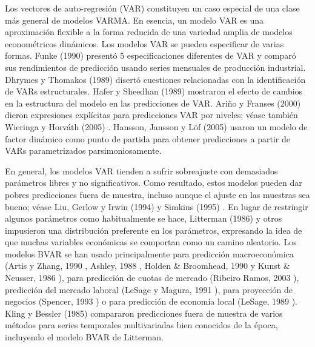 \documentclass{llncs}
\begin{document}
Los vectores de auto-regresión (VAR) constituyen un caso especial de una clase más general de modelos VARMA. En esencia, un modelo VAR es una aproximación flexible a la forma reducida de una variedad amplia de modelos econométricos dinámicos. Los modelos VAR se pueden especificar de varias formas. Funke (1990) \cite{Funke1990363} presentó 5 especificaciones diferentes de VAR y comparó sus rendimientos de predicción usando series mensuales de producción industrial. Dhrymes y Thomakos (1989) \cite{Dhrymes198881} disertó cuestiones relacionadas con la identificación de VARs estructurales. Hafer y Sheedhan (1989) \cite{Hafer1989399} mostraron el efecto de cambios en la estructura del modelo en las predicciones de VAR. Ariño y Franses (2000) \cite{Ariño2000111} dieron expresiones explícitas para predicciones VAR por niveles; véase también Wieringa y Horváth (2005) \cite{Wieringa2005279}. Hansson, Jansson y Löf (2005) \cite{Hansson2005377} usaron un modelo de factor dinámico como punto de partida para obtener predicciones a partir de VARs parametrizados parsimoniosamente.

En general, los modelos VAR tienden a sufrir sobreajuste con demasiados parámetros libres y no significativos. Como resultado, estos modelos pueden dar pobres predicciones fuera de muestra, incluso aunque el ajuste en las muestras sea bueno; véase Liu, Gerlow y Irwin (1994) \cite{Liu1994419} y Simkins (1995) \cite{Simkins1995569}. En lugar de restringir algunos parámetros como habitualmente se hace, Litterman (1986) \cite{Litterman198625} y otros impusieron una distribución preferente en los parámetros, expresando la idea de que muchas variables económicas se comportan como un camino aleatorio. Los modelos BVAR se han usado principalmente para predicción macroeconómica (Artis y Zhang, 1990 \cite{Artis1990349}, Ashley, 1988 \cite{Ashley1988363}, Holden \& Broomhead, 1990 \cite{Holden199011} y Kunst \& Neusser, 1986 \cite{Kunst1986447}), para predicción de cuotas de mercado (Ribeiro Ramos, 2003 \cite{RibeiroRamos200395}), predicción del mercado laboral (LeSage y Magura, 1991 \cite{LeSage1991231}), para proyección de negocios (Spencer, 1993 \cite{Spencer1993407}) o para predicción de economía local (LeSage, 1989  \cite{Lesage198937}). Kling y Bessler (1985) \cite{Kling19855} compararon predicciones fuera de muestra de varios métodos para series temporales multivariadas bien conocidos de la época, incluyendo el modelo BVAR de Litterman.
\end{document}

